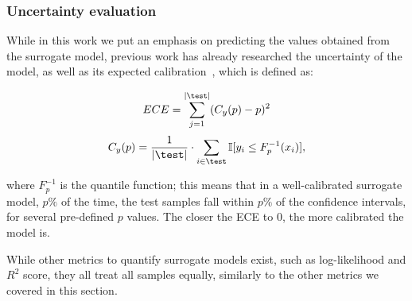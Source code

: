 \subsubsection{Uncertainty evaluation} 
While in this work we put an emphasis on predicting the values obtained from the surrogate model, previous work has already researched the uncertainty of the model, as well as its expected calibration~\cite{FolEtAl23,KulEtAl18}, which is defined as:

\begin{equation*}
    ECE=\sum_{j=1}^{|\test|} (C_y(p)-p)^2
\end{equation*}
\begin{equation*}
    C_y(p)=\frac{1}{|\test|}\cdot \sum_{i\in \test} \mathbb{I}[y_i \leq F^{-1}_p(x_i)],
\end{equation*}

where $F^{-1}_p$ 
is the quantile function; this means that in a well-calibrated surrogate model, $p\%$  of the time, the test samples fall within $p\%$ of the confidence intervals, for several pre-defined $p$ values. The closer the ECE to $0$, the more calibrated the model is.

While other metrics to quantify surrogate models exist, such as log-likelihood and $R^2$ score, they all treat all samples equally, similarly to the other metrics we covered in this section.






